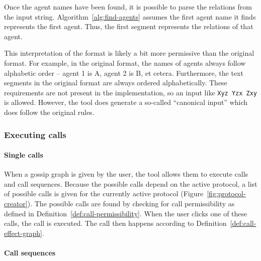 Once the agent names have been found, it is possible to parse the relations from the input string.
Algorithm~\ref{alg:find-agents} assumes the first agent name it finds represents the first agent. 
Thus, the first segment represents the relations of that agent.


This interpretation of the format is likely a bit more permissive than the original format.
For example, in the original format, the names of agents always follow alphabetic order -- agent 1 is A, agent 2 is B, et cetera.
Furthermore, the text segments in the original format are always ordered alphabetically.
These requirements are not present in the implementation, so an input like \texttt{Xyz Yzx Zxy} is allowed.
However, the tool does generate a so-called ``canonical input'' which does follow the original rules.


\subsubsection{Executing calls}
\label{sec:protocol-execution}

\paragraph{Single calls}
\label{sec:call-execution}

When a gossip graph is given by the user, the tool allows them to execute calls and call sequences. 
Because the possible calls depend on the active protocol,
a list of possible calls is given for the currently active protocol (Figure~\ref{fig:protocol-creator}).
The possible calls are found by checking for call permissibility as defined in Definition~\ref{def:call-permissibility}.
When the user clicks one of these calls, the call is executed.
The call then happens according to Definition~\ref{def:call-effect-graph}.

\paragraph{Call sequences}
\label{sec:call-sequence-executiun}

